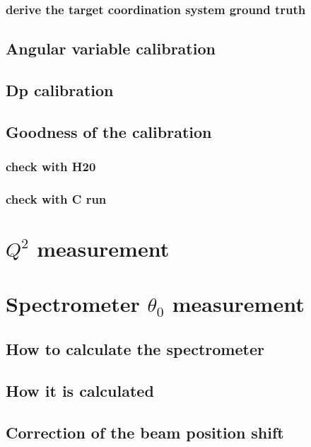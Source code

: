 \subsubsection{derive the target coordination system ground truth}


\subsection{Angular variable calibration}
\subsection{Dp calibration}
\subsection{Goodness of the calibration}
\subsubsection{check with H20}
\subsubsection{check with C run}

\section{$Q^2$ measurement}

\section{Spectrometer $\theta_0$ measurement}

\subsection{How to calculate the spectrometer}
\subsection{How it is calculated}
\subsection{Correction of the beam position shift}







